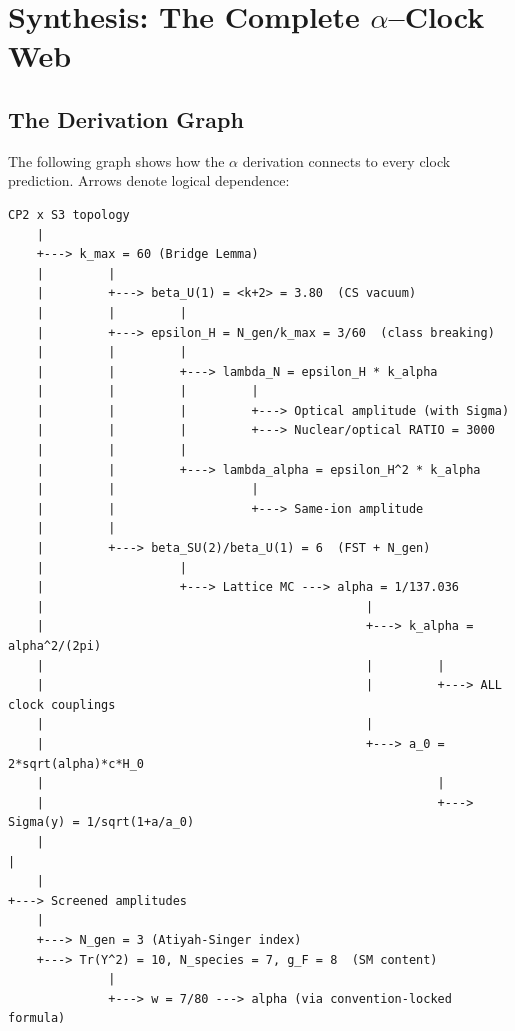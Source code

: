 \documentclass[11pt]{article}
\theoremstyle{definition}
\theoremstyle{remark}
\begin{document}
\section{Synthesis: The Complete $\alpha$--Clock Web}
\label{sec:synthesis}

\subsection{The Derivation Graph}

The following graph shows how the $\alpha$ derivation connects to every
clock prediction. Arrows denote logical dependence:

\begin{verbatim}
CP2 x S3 topology
    |
    +---> k_max = 60 (Bridge Lemma)
    |         |
    |         +---> beta_U(1) = <k+2> = 3.80  (CS vacuum)
    |         |         |
    |         +---> epsilon_H = N_gen/k_max = 3/60  (class breaking)
    |         |         |
    |         |         +---> lambda_N = epsilon_H * k_alpha
    |         |         |         |
    |         |         |         +---> Optical amplitude (with Sigma)
    |         |         |         +---> Nuclear/optical RATIO = 3000
    |         |         |
    |         |         +---> lambda_alpha = epsilon_H^2 * k_alpha
    |         |                   |
    |         |                   +---> Same-ion amplitude
    |         |
    |         +---> beta_SU(2)/beta_U(1) = 6  (FST + N_gen)
    |                   |
    |                   +---> Lattice MC ---> alpha = 1/137.036
    |                                             |
    |                                             +---> k_alpha = alpha^2/(2pi)
    |                                             |         |
    |                                             |         +---> ALL clock couplings
    |                                             |
    |                                             +---> a_0 = 2*sqrt(alpha)*c*H_0
    |                                                       |
    |                                                       +---> Sigma(y) = 1/sqrt(1+a/a_0)
    |                                                                 |
    |                                                                 +---> Screened amplitudes
    |
    +---> N_gen = 3 (Atiyah-Singer index)
    +---> Tr(Y^2) = 10, N_species = 7, g_F = 8  (SM content)
              |
              +---> w = 7/80 ---> alpha (via convention-locked formula)
\end{verbatim}
\end{document}

